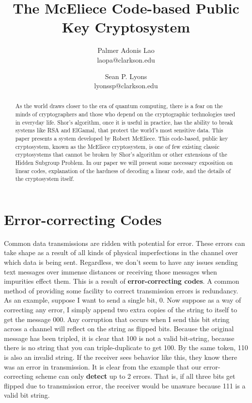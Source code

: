 \documentclass[12pt]{article}
\title{The McEliece Code-based Public Key Cryptosystem}
\author{Palmer Adonis Lao\\
 laopa@clarkson.edu\\
\and
Sean P. Lyons\\
lyonssp@clarkson.edu\\}
\theoremstyle{definition}
\begin{document}
\maketitle


\begin{abstract}
As the world draws closer to the era of quantum computing, there is a fear on the minds of cryptographers and those who depend on the cryptographic technologies used in everyday life. Shor's algorithm, once it is useful in practice, has the ability to break systems like RSA and ElGamal, that protect the world's most sensitive data. This paper presents a system developed by Robert McEliece.  This code-based, public key cryptosystem, known as the McEliece cryptosystem, is one of few existing classic cryptosystems that cannot be broken by Shor's algorithm or other extensions of the Hidden Subgroup Problem.  In our paper we will present some necessary exposition on linear codes, explanation of the hardness of decoding a linear code, and the details of the cryptosystem itself.   
\end{abstract}

\newpage

\section{Error-correcting Codes}
\paragraph{} Common data transmissions are ridden with potential for error.  These errors can take shape as a result of all kinds of physical imperfections in the channel over which data is being sent.  Regardless, we don't seem to have any issues sending text messages over immense distances or receiving those messages when impurities effect them.  This is a result of \textbf{error-correcting codes}.  A common method of providing some facility to correct transmission errors is redundancy.  As an example, suppose I want to send a single bit, 0.  Now suppose as a way of correcting any error, I simply append two extra copies of the string to itself to get the message 000.  Any corruption that occurs when I send this bit string across a channel will reflect on the string as flipped bits.  Because the original message has been tripled, it is clear that 100 is not a valid bit-string, because there is no string that you can triple-duplicate to get 100.  By the same token, 110 is also an invalid string.  If the receiver sees behavior like this, they know there was an error in transmission.  It is clear from the example that our error-correcting scheme can only \textbf{detect} up to 2 errors.  That is, if all three bits get flipped due to transmission error, the receiver would be unaware because 111 is a valid bit string.  \\
\end{document}
